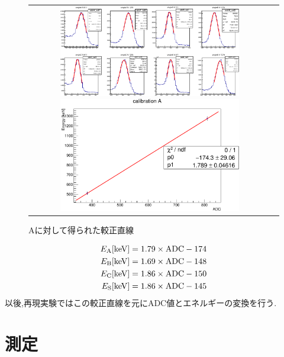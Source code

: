 \begin{figure}[htbp]
	\begin{tabular}{cc}
		\begin{minipage}[t]{0.5\hsize}
			\centering
				\includegraphics[width=80mm]{fig/isb/gaussFit.pdf}
				\caption{ガウス関数によるフィッティング}
				\label{fig:fit_gauss}
		\end{minipage}
		\begin{minipage}[t]{0.5\hsize}
			\centering
				\includegraphics[width=80mm]{fig/isb/fitA.pdf}
				\caption{Aに対して得られた較正直線}
				\label{fig:fitA}
		\end{minipage}
	\end{tabular}
\end{figure}
\begin{align}
	E_\textrm{A}\textrm{[keV]}=1.79\times {\rm ADC}-174 \nonumber \\ 
	E_\textrm{B}\textrm{[keV]}=1.69\times {\rm ADC}-148 \nonumber \\
	E_\textrm{C}\textrm{[keV]}=1.86\times {\rm ADC}-150 \nonumber \\
	E_\textrm{S}\textrm{[keV]}=1.86\times {\rm ADC}-145 \nonumber
\end{align}
以後,再現実験ではこの較正直線を元にADC値とエネルギーの変換を行う.

\section{測定}

